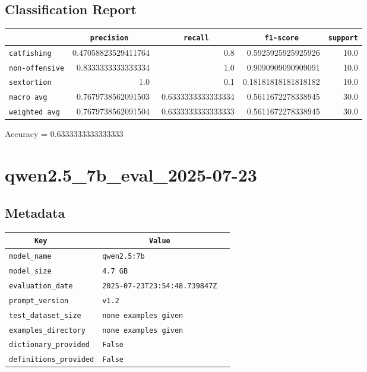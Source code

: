 \documentclass{article}
\begin{document}
\subsection{Classification Report}

\begin{center}
\begin{tabular}{l | r | r | r | r} \hline
    \verb|            | & \verb|    precision     | & \verb|      recall      | & \verb|     f1-score     | & \verb|support| \\ \hline
    \hline
    \verb|catfishing | & 0.47058823529411764 & 0.8 & 0.5925925925925926 &    10.0 \\ \hline
    \verb|non-offensive| & 0.8333333333333334 & 1.0 & 0.9090909090909091 &    10.0 \\ \hline
    \verb|sextortion | & 1.0 & 0.1 & 0.18181818181818182 &    10.0 \\ \hline
    \verb|macro avg  | & 0.7679738562091503 & 0.6333333333333334 & 0.5611672278338945 &    30.0 \\ \hline
    \verb|weighted avg| & 0.7679738562091504 & 0.6333333333333333 & 0.5611672278338945 &    30.0 \\ \hline
\end{tabular}
\end{center}

\begin{center}
Accuracy = 0.6333333333333333
\end{center}

\section{qwen2.5\_7b\_eval\_2025-07-23}
\subsection{Metadata}

\begin{center}
\begin{tabular}{l | l} \hline
    \verb|      Key      | & \verb|           Value           | \\ \hline
    \hline
    \verb|model_name    | & \verb|qwen2.5:7b                   | \\ \hline
    \verb|model_size    | & \verb|4.7 GB                       | \\ \hline
    \verb|evaluation_date| & \verb|2025-07-23T23:54:48.739847Z  | \\ \hline
    \verb|prompt_version| & \verb|v1.2                         | \\ \hline
    \verb|test_dataset_size| & \verb|none examples given          | \\ \hline
    \verb|examples_directory| & \verb|none examples given          | \\ \hline
    \verb|dictionary_provided| & \verb|False                        | \\ \hline
    \verb|definitions_provided| & \verb|False                        | \\ \hline
\end{tabular}
\end{center}
\end{document}
